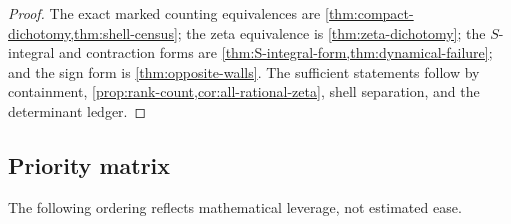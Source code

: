 \documentclass[10pt,oneside]{article}
\theoremstyle{definition}
\theoremstyle{remark}
\begin{document}
\begin{proof}
The exact marked counting equivalences are \cref{thm:compact-dichotomy,thm:shell-census}; the zeta equivalence is \cref{thm:zeta-dichotomy}; the \(S\)-integral and contraction forms are \cref{thm:S-integral-form,thm:dynamical-failure}; and the sign form is \cref{thm:opposite-walls}.  The sufficient statements follow by containment, \cref{prop:rank-count,cor:all-rational-zeta}, shell separation, and the determinant ledger.
\end{proof}

\subsection{Priority matrix}
The following ordering reflects mathematical leverage, not estimated ease.
\end{document}
